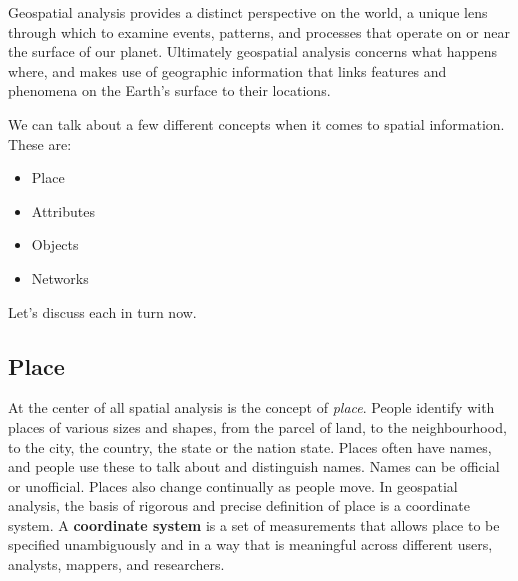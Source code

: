 \documentclass[
]{book}
\providecommand{\tightlist}{%
  \setlength{\itemsep}{0pt}\setlength{\parskip}{0pt}}
\begin{document}
Geospatial analysis provides a distinct perspective on the world, a unique lens through which to examine events, patterns, and processes that operate on or near the surface of our planet. Ultimately geospatial analysis concerns what happens where, and makes use of geographic information that links features and phenomena on the Earth's surface to their locations.

We can talk about a few different concepts when it comes to spatial information. These are:

\begin{itemize}
\tightlist
\item
  Place
\item
  Attributes
\item
  Objects
\item
  Networks
\end{itemize}

Let's discuss each in turn now.

\hypertarget{place}{%
\subsection{Place}\label{place}}

At the center of all spatial analysis is the concept of \emph{place}. People identify with places of various sizes and shapes, from the parcel of land, to the neighbourhood, to the city, the country, the state or the nation state. Places often have names, and people use these to talk about and distinguish names. Names can be official or unofficial. Places also change continually as people move. In geospatial analysis, the basis of rigorous and precise definition of place is a coordinate system. A \textbf{coordinate system} is a set of measurements that allows place to be specified unambiguously and in a way that is meaningful across different users, analysts, mappers, and researchers.
\end{document}
